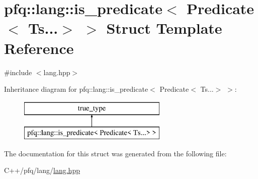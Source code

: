 \hypertarget{structpfq_1_1lang_1_1is__predicate_3_01Predicate_3_01Ts_8_8_8_4_01_4}{\section{pfq\+:\+:lang\+:\+:is\+\_\+predicate$<$ Predicate$<$ Ts...$>$ $>$ Struct Template Reference}
\label{structpfq_1_1lang_1_1is__predicate_3_01Predicate_3_01Ts_8_8_8_4_01_4}
}


{\ttfamily \#include $<$lang.\+hpp$>$}

Inheritance diagram for pfq\+:\+:lang\+:\+:is\+\_\+predicate$<$ Predicate$<$ Ts...$>$ $>$\+:\begin{figure}[H]
\begin{center}
\leavevmode
\includegraphics[height=2.000000cm]{structpfq_1_1lang_1_1is__predicate_3_01Predicate_3_01Ts_8_8_8_4_01_4}
\end{center}
\end{figure}


The documentation for this struct was generated from the following file\+:\begin{DoxyCompactItemize}
\item 
C++/pfq/lang/\hyperlink{lang_8hpp}{lang.\+hpp}\end{DoxyCompactItemize}
